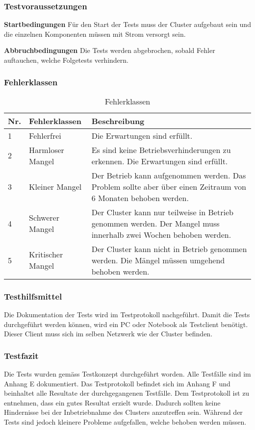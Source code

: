 \subsubsection{Testvoraussetzungen}
\textbf{Startbedingungen}\newline
Für den Start der Tests muss der Cluster aufgebaut sein und die einzelnen Komponenten müssen mit Strom versorgt sein. 

\textbf{Abbruchbedingungen}\newline
Die Tests werden abgebrochen, sobald Fehler auftauchen, welche Folgetests verhindern.

\subsubsection{Fehlerklassen}
\begin{table}[H]
\centering
\begin{tabular}{p{1cm}p{4cm}p{11cm}}
\hline
\rowcolor{heading} \textbf{Nr.} & \textbf{Fehlerklassen} & \textbf{Beschreibung} \\\hline
1 & Fehlerfrei & Die Erwartungen sind erfüllt.  \\\hline
2 & Harmloser Mangel & Es sind keine Betriebsverhinderungen zu erkennen. Die Erwartungen sind erfüllt. \\\hline
3 & Kleiner Mangel & Der Betrieb kann aufgenommen werden. Das Problem sollte aber über einen Zeitraum von 6 Monaten behoben werden.  \\\hline
4 & Schwerer Mangel & Der Cluster kann nur teilweise in Betrieb genommen werden. Der Mangel muss innerhalb zwei Wochen behoben werden. \\\hline
5 & Kritischer Mangel & Der Cluster kann nicht in Betrieb genommen werden. Die Mängel müssen umgehend behoben werden. \\\hline
\end{tabular}
\caption{Fehlerklassen}
\end{table}

\subsubsection{Testhilfsmittel}
Die Dokumentation der Tests wird im Testprotokoll nachgeführt. Damit die Tests durchgeführt werden können, wird ein PC oder Notebook als Testclient benötigt. Dieser Client muss sich im selben Netzwerk wie der Cluster befinden.


\subsubsection{Testfazit}
Die Tests wurden gemäss Testkonzept durchgeführt worden. Alle Testfälle sind im Anhang E dokumentiert. Das Testprotokoll befindet sich im Anhang F und beinhaltet alle Resultate der durchgegangenen Testfälle. Dem Testprotokoll ist zu entnehmen, dass ein gutes Resultat erzielt wurde. Dadurch sollten keine Hindernisse bei der Inbetriebnahme des Clusters anzutreffen sein. Während der Tests sind jedoch kleinere Probleme aufgefallen, welche behoben werden müssen.\newline

